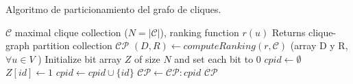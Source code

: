\begin{algorithm}
\caption{Algoritmo de particionamiento del grafo de cliques.}
\label{alg:clustering}
\begin{algorithmic}[1]
\REQUIRE $\mathcal{C}$ maximal clique collection ($N=|\mathcal{C}|$), ranking function $r(u)$
\ENSURE Returns clique-graph partition collection $\mathcal{C}\mathcal{P}$
\STATE $(D,R) \leftarrow computeRanking(r,\mathcal{C})$ (array D y R, $\forall u \in V$ ) \label{alg:clustering:rankarray} 
\STATE Initialize bit array $Z$ of size $N$ and set each bit to 0
    \STATE $cpid \leftarrow \emptyset$
          \STATE $Z[id] \leftarrow 1$
          \STATE $cpid \leftarrow cpid \cup \{id\}$
    \ENDFOR
      \STATE $\mathcal{C}\mathcal{P} \leftarrow \mathcal{C}\mathcal{P} : cpid$
    \ENDIF 
 \ENDFOR
\RETURN $\mathcal{C}\mathcal{P}$
\end{algorithmic}
\end{algorithm}
